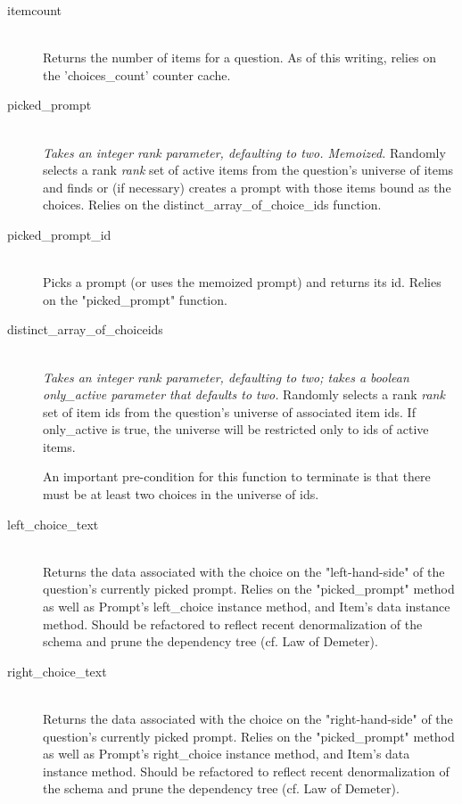 \documentclass[11pt]{book}
\begin{document}
\begin{description}
	\item[itemcount]  \hfill \\
  Returns the number of items for a question.  As of this writing, relies on the 'choices\_count' counter cache.
  	\item[picked\_prompt]  \hfill \\
  \emph{Takes an integer rank parameter, defaulting to two. Memoized.}  Randomly selects a rank \emph{rank} set of active items from the question's universe of items and finds or (if necessary) creates a prompt with those items bound as the choices.  Relies on the distinct\_array\_of\_choice\_ids function.
  
	\item[picked\_prompt\_id]  \hfill \\
  Picks a prompt (or uses the memoized prompt) and returns its id.  Relies on the "picked\_prompt" function.
  
  \item[distinct\_array\_of\_choiceids]  \hfill \\
  \emph{Takes an integer rank parameter, defaulting to two; takes a boolean only\_active parameter that defaults to two. }  Randomly selects a rank \emph{rank} set of item ids from the question's universe of associated item ids.  If only\_active is true, the universe will be restricted only to ids of active items.
  
  An important pre-condition for this function to terminate is that there must be at least two choices in the universe of ids.
  
  \item[left\_choice\_text]  \hfill \\
  \emph{}  Returns the data associated with the choice on the "left-hand-side" of the question's currently picked prompt.  Relies on the "picked\_prompt" method as well as Prompt's left\_choice instance method, and Item's data instance method.  Should be refactored to reflect recent denormalization of the schema and prune the dependency tree (cf. Law of Demeter).
  
  \item[right\_choice\_text]  \hfill \\
  \emph{}  Returns the data associated with the choice on the "right-hand-side" of the question's currently picked prompt.  Relies on the "picked\_prompt" method as well as Prompt's right\_choice instance method, and Item's data instance method.  Should be refactored to reflect recent denormalization of the schema and prune the dependency tree (cf. Law of Demeter).
  

\end{description}
\end{document}
